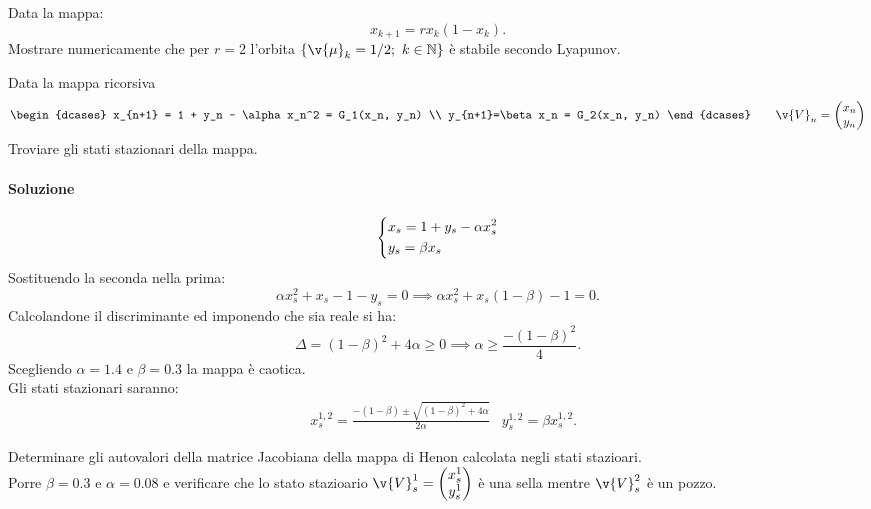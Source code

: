 \begin{ex}[Numerico]
    Data la mappa:
    \[
	x_{k+1} = rx_k(1-x_k) 
    .\] 
    Mostrare numericamente che per $r=2$ l'orbita $\left\{\v{\mu}_k = 1 /2; \ k \in \mathbb{N}\right\}$ è stabile secondo Lyapunov.
\end{ex}
\noindent
\begin{ex}
    Data la mappa ricorsiva
    \[
    \begin{dcases}
	x_{n+1} = 1 + y_n - \alpha x_n^2 = G_1(x_n, y_n) \\
	y_{n+1}=\beta x_n = G_2(x_n, y_n) 
    \end{dcases}
    \qquad
    \v{V}_n = \begin{pmatrix} x_n \\ y_n \end{pmatrix}
    \]
    Troviare gli stati stazionari della mappa.
\end{ex}
\noindent
\paragraph{Soluzione}%
    \[
    \begin{dcases}
    x_s = 1 + y_s - \alpha x_s^2\\
    y_s = \beta x_s
    \end{dcases}
    \]
    Sostituendo la seconda nella prima:
    \[
        \alpha x_s^2 + x_s - 1 - y_s = 0 \implies 
	\alpha x_s^2 + x_s(1-\beta) -1 = 0
    .\] 
    Calcolandone il discriminante ed imponendo che sia reale si ha:
    \[
	\Delta  = (1-\beta)^2 + 4 \alpha\ge 0 \implies  \alpha  \ge \frac{-(1-\beta)^2}{4}
    .\] 
    Scegliendo $\alpha  = 1.4$ e $\beta  = 0.3$ la mappa è caotica.\\
    Gli stati stazionari saranno:
    \[\begin{aligned}
	& x_s^{1,2} = \frac{-(1-\beta) \pm \sqrt{(1-\beta  )^2 + 4\alpha}}{2\alpha} 
	& y_s^{1, 2} = \beta x_s^{1, 2}
    .\end{aligned}\]

\begin{ex}
    Determinare gli autovalori della matrice Jacobiana della mappa di Henon calcolata negli stati stazioari.\\
    Porre $\beta =0.3$ e $\alpha =0.08$ e verificare che lo stato stazioario $\v{V}_s^1 = \begin{pmatrix} x_s^1 \\ y_s^1 \end{pmatrix}$ è una sella mentre $\v{V}_s^2$ è un pozzo. 
\end{ex}
\noindent
